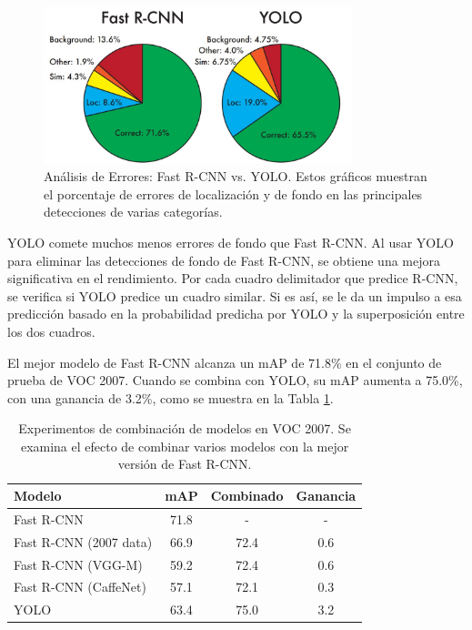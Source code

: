 \begin{figure}[h]
	\centering
	\includegraphics[width=0.8\textwidth]{2/figures/yolo4.jpeg}
	\caption{Análisis de Errores: Fast R-CNN vs. YOLO. Estos gráficos muestran el porcentaje de errores de localización y de fondo en las principales detecciones de varias categorías.}
	\label{fig:error_analysis} 
\end{figure}

YOLO comete muchos menos errores de fondo que Fast R-CNN. Al usar YOLO para eliminar las detecciones de fondo de Fast R-CNN, se obtiene una mejora significativa en el rendimiento. Por cada cuadro delimitador que predice R-CNN, se verifica si YOLO predice un cuadro similar. Si es así, se le da un impulso a esa predicción basado en la probabilidad predicha por YOLO y la superposición entre los dos cuadros.

El mejor modelo de Fast R-CNN alcanza un mAP de 71.8\% en el conjunto de prueba de VOC 2007. Cuando se combina con YOLO, su mAP aumenta a 75.0\%, con una ganancia de 3.2\%, como se muestra en la Tabla \ref{table:combination}.

\begin{table}[h]
	\centering
	\begin{tabular}{|l|c|c|c|}
		\hline
		\textbf{Modelo} & \textbf{mAP} & \textbf{Combinado} & \textbf{Ganancia} \\
		\hline
		Fast R-CNN & 71.8 & - & - \\
		Fast R-CNN (2007 data) & 66.9 & 72.4 & 0.6 \\
		Fast R-CNN (VGG-M) & 59.2 & 72.4 & 0.6 \\
		Fast R-CNN (CaffeNet) & 57.1 & 72.1 & 0.3 \\
		YOLO & 63.4 & 75.0 & 3.2 \\
		\hline
	\end{tabular}
	\caption{Experimentos de combinación de modelos en VOC 2007. Se examina el efecto de combinar varios modelos con la mejor versión de Fast R-CNN.}
	\label{table:combination}
\end{table}

